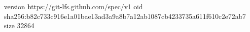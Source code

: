 version https://git-lfs.github.com/spec/v1
oid sha256:b82c733c916e1a01bae13ad3a9a8b7a12ab1087cb4233735a611f610c2e72ab7
size 32864
